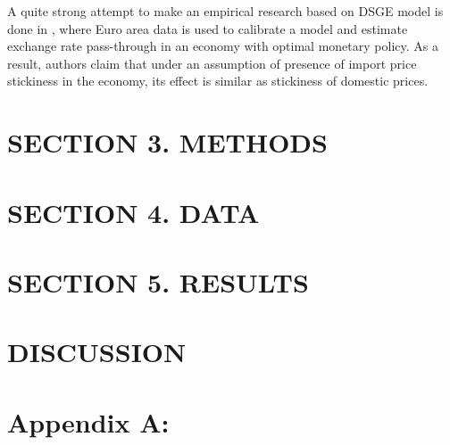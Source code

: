 \documentclass[12pt, a4paper]{extarticle}
\begin{document}
A quite strong attempt to make an empirical research based on DSGE model is done in \cite{Smets2002}, where Euro area data is used to calibrate a model and estimate exchange rate pass-through in an economy with optimal monetary policy. As a result, authors claim that under an assumption of presence of import price stickiness in the economy, its effect is similar as stickiness of domestic prices.








 


\section*{SECTION 3. METHODS}
\setcounter{section}{3}


\section*{SECTION 4. DATA}

\setcounter{section}{2}


\section*{SECTION 5. RESULTS}
\setcounter{section}{4}
\setcounter{subsection}{0}

\clearpage

\section*{DISCUSSION}


\renewcommand*{\newblockpunct}{\addperiod\space\bibsentence}
\newpage
\linespread{1.3}

\printbibliography
{}
\newpage
\setcounter{figure}{1}
\setcounter{table}{1}
\makeatletter
\renewcommand*{\thetable}{\alph{table}}
\renewcommand*{\thefigure}{\alph{figure}}
\let\c@table\c@figure
\makeatother 

\normalsize
\linespread{0.5}
\section*{Appendix A: }
\label{app:a}

~\\
\clearpage
\newpage
\pagebreak
\end{document}
